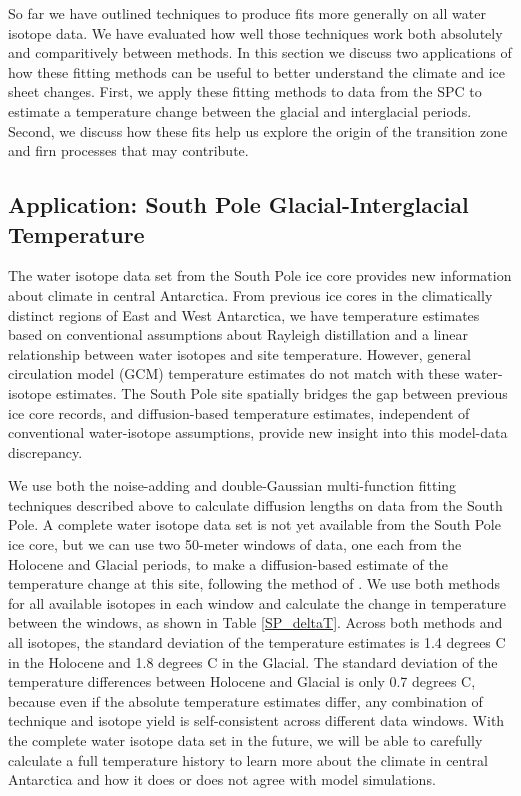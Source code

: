 \documentclass[draft, jgrga]{AGUTeX}
\begin{document}
\begin{article}
So far we have outlined techniques to produce fits more generally on all water isotope data. We have evaluated how well those techniques work both absolutely and comparitively between methods. In this section we discuss two applications of how these fitting methods can be useful to better understand the climate and ice sheet changes. First, we apply these fitting methods to data from the SPC to estimate a temperature change between the glacial and interglacial periods. Second, we discuss how these fits help us explore the origin of the transition zone and firn processes that may contribute.

\subsection{Application: South Pole Glacial-Interglacial Temperature}

The water isotope data set from the South Pole ice core provides new information about climate in central Antarctica. From previous ice cores in the climatically distinct regions of East and West Antarctica, we have temperature estimates based on conventional assumptions about Rayleigh distillation and a linear relationship between water isotopes and site temperature. However, general circulation model (GCM) temperature estimates do not match with these water-isotope estimates. The South Pole site spatially bridges the gap between previous ice core records, and diffusion-based temperature estimates, independent of conventional water-isotope assumptions, provide new insight into this model-data discrepancy.

We use both the noise-adding and double-Gaussian multi-function fitting techniques described above to calculate diffusion lengths on data from the South Pole. A complete water isotope data set is not yet available from the South Pole ice core, but we can use two 50-meter windows of data, one each from the Holocene and Glacial periods, to make a diffusion-based estimate of the temperature change at this site, following the method of \citet{Gkinis2014}. We use both methods for all available isotopes in each window and calculate the change in temperature between the windows, as shown in Table \ref{SP_deltaT}. Across both methods and all isotopes, the standard deviation of the temperature estimates is 1.4 degrees C in the Holocene and 1.8 degrees C in the Glacial. The standard deviation of the temperature differences between Holocene and Glacial is only 0.7 degrees C, because even if the absolute temperature estimates differ, any combination of technique and isotope yield is self-consistent across different data windows. With the complete water isotope data set in the future, we will be able to carefully calculate a full temperature history to learn more about the climate in central Antarctica and how it does or does not agree with model simulations.



\end{article}
\end{document}
